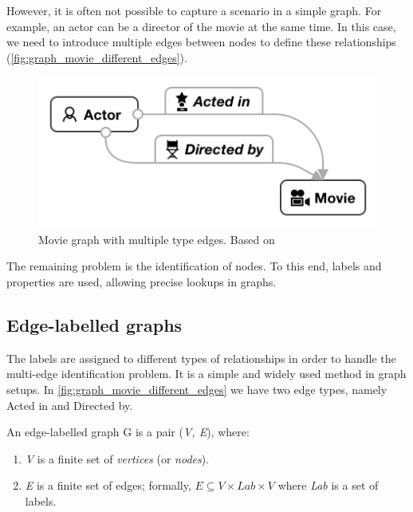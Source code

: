 However, it is often not possible to capture a scenario in a simple graph.
For example, an actor can be a director of the movie at the same time.
In this case, we need to introduce multiple edges between nodes to define these relationships (\autoref{fig:graph_movie_different_edges}).

\begin{figure}[!ht]
  \centering
  \includegraphics[scale=0.3]{figures/graph_movie_different_edges.png}
  \caption{Movie graph with multiple type edges. Based on~\cite{DBLP:journals/csur/AnglesABHRV17}} 
  \label{fig:graph_movie_different_edges}
\end{figure}

The remaining problem is the identification of nodes. To this end, labels and properties are used, allowing precise lookups in graphs.

\subsection{Edge-labelled graphs} 

The labels are assigned to different types of relationships in order to handle the multi-edge identification problem.
It is a simple and widely used method in graph setups.
In \autoref{fig:graph_movie_different_edges} we have two edge types, namely \textsf{Acted in} and \textsf{Directed by}.

\begin{definition}\label{def:edge_labelled_graph}\cite{DBLP:journals/csur/AnglesABHRV17}
An edge-labelled graph G is a pair (\textit{V, E}), where:

\begin{enumerate}
  \item \textit{V} is a finite set of \textit{vertices} (or \textit{nodes}).
  \item \textit{E} is a finite set of edges; formally, \textit{$E \subseteq V \times \mathit{Lab} \times V$} where \textit{Lab} is a set of labels.
\end{enumerate}
\end{definition}


